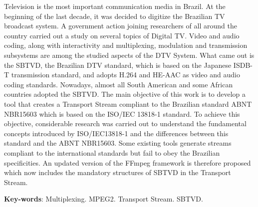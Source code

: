 \documentclass[
	12pt,				%
	openright,			%
	twoside,			%
	a4paper,			%
	brazil,
	french,				%
	english
	]{abntex2}
\begin{document}
\begin{resumo}[Abstract]


Television is the most important communication media in Brazil. At the beginning of the last decade, it was decided to digitize the Brazilian TV broadcast system. A government action joining researchers of all around the country carried out a study on several topics of Digital TV. Video and audio coding, along with interactivity and multiplexing, modulation and transmission subsystems are among the studied aspects of the DTV System. What came out is the SBTVD, the Brazilian DTV standard, which is based on the Japanese ISDB-T transmission standard, and adopts H.264 and HE-AAC as video and audio coding standards. Nowadays, almost all South American and some African countries adopted the SBTVD. The main objective of this work is to develop a tool that creates a Transport Stream compliant to the Brazilian standard ABNT NBR15603 which is based on the ISO/IEC 13818-1 standard. To achieve this objective, considerable research was carried out to understand the fundamental concepts introduced by ISO/IEC13818-1 and the differences between this standard and the ABNT NBR15603. Some existing tools generate streams compliant to the international standards but fail to obey the Brazilian specificities. An updated version of the FFmpeg framework is therefore proposed which now includes the mandatory structures of SBTVD in the Transport Stream.

   \vspace{\onelineskip}
 
   \noindent 
   \textbf{Key-words}: Multiplexing. MPEG2. Transport Stream. SBTVD.
 
\end{resumo}
\end{document}
